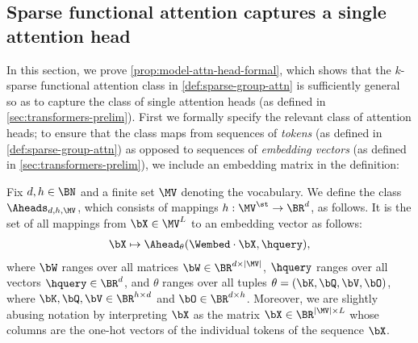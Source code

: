 \documentclass{article}
\begin{document}
\subsection{Sparse functional attention captures a single attention head}
In this section, we prove \cref{prop:model-attn-head-formal}, which shows that the $k$-sparse functional attention class in \cref{def:sparse-group-attn} is sufficiently general so as to capture the class of single attention heads (as defined in \cref{sec:transformers-prelim}). First we formally specify the relevant class of attention heads; to ensure that the class maps from sequences of \emph{tokens} (as defined in \cref{def:sparse-group-attn}) as opposed to sequences of \emph{embedding vectors} (as defined in \cref{sec:transformers-prelim}), we include an embedding matrix in the definition:
\begin{definition}
  Fix $d,h \in \BN$ and a finite set $\MV$ denoting the vocabulary. We define the class $\Aheads_{d,h,\MV}$, which consists of mappings $h : \MV^\st \to \BR^d$, as follows. It is the set of all mappings from $\bX \in \MV^L$ to an embedding vector as follows:
  \begin{align}
\bX \mapsto \Ahead_\theta(\Wembed \cdot \bX, \hquery)\nonumber,
  \end{align}
  where $\bW$ ranges over all matrices $\bW \in \BR^{d \times |\MV|}$, $\hquery$ ranges over all vectors $\hquery \in \BR^d$,  and $\theta$ ranges over all tuples $\theta = (\bK, \bQ, \bV, \bO)$, where $\bK, \bQ, \bV \in \BR^{h \times d}$ and $\bO \in \BR^{d \times h}$. Moreover, we are slightly abusing notation by interpreting $\bX$ as the matrix $\bX \in \BR^{|\MV| \times L}$ whose columns are the one-hot vectors of the individual tokens of the sequence $\bX$. 
\end{definition}
\end{document}
